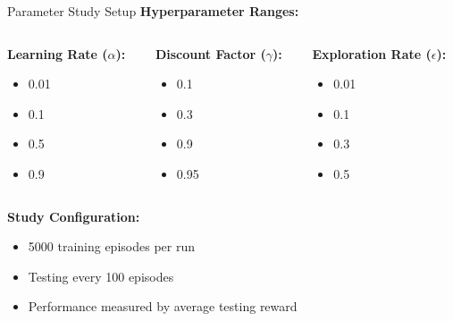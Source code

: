 \documentclass[aspectratio=169]{beamer}
\begin{document}
\begin{frame}{Parameter Study Setup}
    \textbf{Hyperparameter Ranges:}
    \begin{columns}
        \begin{column}{0.33\textwidth}
            \textbf{Learning Rate ($\alpha$):}
            \begin{itemize}
                \item 0.01
                \item 0.1
                \item 0.5
                \item 0.9
            \end{itemize}
        \end{column}
        \begin{column}{0.33\textwidth}
            \textbf{Discount Factor ($\gamma$):}
            \begin{itemize}
                \item 0.1
                \item 0.3
                \item 0.9
                \item 0.95
            \end{itemize}
        \end{column}
        \begin{column}{0.33\textwidth}
            \textbf{Exploration Rate ($\epsilon$):}
            \begin{itemize}
                \item 0.01
                \item 0.1
                \item 0.3
                \item 0.5
            \end{itemize}
        \end{column}
    \end{columns}
    
    \vspace{0.5cm}
    \textbf{Study Configuration:}
    \begin{itemize}
        \item 5000 training episodes per run
        \item Testing every 100 episodes
        \item Performance measured by average testing reward
    \end{itemize}
\end{frame}
\end{document}
